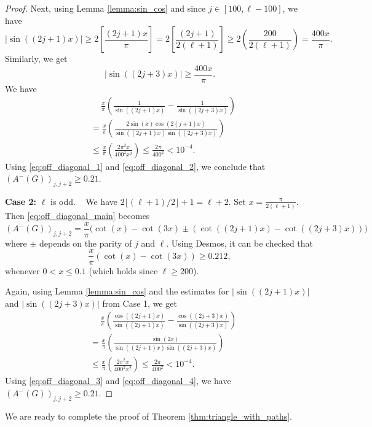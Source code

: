 \documentclass{article}
\begin{document}
\begin{proof}
Next, using Lemma \ref{lemma:sin_cos} and since $j\in [100, \ell - 100]$, we have 
\[ |\sin((2j+1)x)| \ge 2\left[ \frac{(2j+1)x}{\pi}\right] = 2\left[ \frac{(2j+1)}{2(\ell +1)}\right]\ge 2\left(\frac{200}{2(\ell +1)}\right) = \frac{400x}{\pi}.\]
Similarly, we get
\[ |\sin((2j+3)x)|\ge \frac{400x}{\pi}.\]
We have 
\begin{align}\label{eq:off_diagonal_2}
     & \  \quad \frac{x}{\pi}\left(\frac{1}{\sin((2j + 1) x)} - \frac{1}{\sin((2j + 3) x)}\right) \nonumber\\
     & = \frac{x}{\pi}\left( \frac{2 \sin(x) \cos(2(j + 1) x)}{\sin((2j + 1) x) \sin((2j + 3) x)}\right)\nonumber\\
     & \le \frac{x}{\pi}\left(\frac{2 \pi^2 x}{400^2 x^2}\right) \le \frac{2\pi}{400^2}< 10^{-4}.
\end{align}
Using \eqref{eq:off_diagonal_1} and \eqref{eq:off_diagonal_2}, we conclude that $(A^-(G))_{j, j + 2} \geq 0.21.$

\textbf{Case 2:} $\ell$ is odd. ~ 
We have $2 \lfloor (\ell + 1) / 2 \rfloor + 1 = \ell + 2.$
Set $x = \frac{\pi}{2(\ell + 1)}$. Then \eqref{eq:off_diagonal_main} becomes 
\[(A^-(G))_{j, j + 2} = \frac{x}{\pi}\bigg(\cot(x) - \cot(3x) \pm \left(\cot((2j + 1) x) - \cot((2j + 3) x)\right)\bigg)\]
where $\pm$ depends on the parity of $j$ and $\ell$. Using Desmos, it can be checked that
\begin{equation}\label{eq:off_diagonal_3}
    \frac{x}{\pi}(\cot(x)-\cot(3x))\ge 0.212, 
\end{equation}
whenever $0<x\le 0.1$ (which holds since $\ell \ge 200$).

Again, using Lemma \ref{lemma:sin_cos} and the estimates for $|\sin((2j+1)x)|$ and $|\sin((2j+3)x)|$ from Case 1, we get
\begin{align}\label{eq:off_diagonal_4}
     & \  \quad \frac{x}{\pi}\left(\frac{\cos((2j + 1) x)}{\sin((2j + 1) x)} - \frac{\cos((2j + 3) x)}{\sin((2j + 3) x)}\right) \nonumber\\
     & = \frac{x}{\pi}\left( \frac{\sin(2x)}{\sin((2j + 1) x) \sin((2j + 3) x)}\right)\nonumber\\
     & \le \frac{x}{\pi}\left(\frac{2 \pi^2 x}{400^2 x^2}\right) \le \frac{2\pi}{400^2}< 10^{-4}.
\end{align}
Using \eqref{eq:off_diagonal_3} and \eqref{eq:off_diagonal_4}, we have $(A^-(G))_{j, j + 2} \geq 0.21.$
\end{proof}

We are ready to complete the proof of Theorem \ref{thm:triangle_with_paths}.
\end{document}
